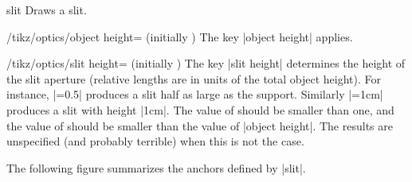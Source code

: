 \documentclass[a4paper]{ltxdoc}
\begin{document}
\begin{shape}{slit}
Draws a slit.

\begin{codeexample}[width=6cm]
\end{codeexample}

\begin{key}{/tikz/optics/object height= (initially )}
    The key |object height| applies.
\end{key}


\begin{key}{/tikz/optics/slit height= (initially )}
The key |slit height| determines the height of the slit aperture (relative lengths are in units of the total object height).
For instance, |=0.5| produces a slit half as large as the support.
Similarly |=1cm| produces a slit with height |1cm|. 
The value of  should be smaller than one, and the value of  should be smaller than the value of |object height|. 
The results are unspecified (and probably terrible) when this is not the case.

\begin{codeexample}[width=6cm]
\end{codeexample}
\end{key}

The following figure summarizes the anchors defined by |slit|.

\begin{codeexample}[]
\Huge
{}
\end{codeexample}

\end{shape}
\end{document}
